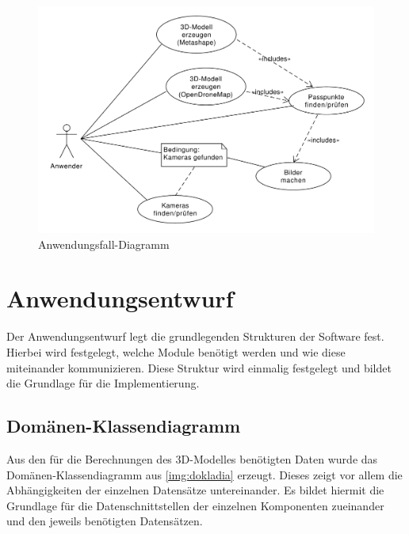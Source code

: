 \documentclass[./00PhotoBox.tex]{subfiles}
\begin{document}
\begin{figure}
    \centering
    \includegraphics[width=1\textwidth]{./img/uml/uml_usecases.pdf}
    \caption{Anwendungsfall-Diagramm} %
    \label{img:anwendungsfall} %
\end{figure}


\section{Anwendungsentwurf}
Der Anwendungsentwurf legt die grundlegenden Strukturen der Software fest. Hierbei wird festgelegt, welche Module benötigt werden und wie diese miteinander kommunizieren. Diese Struktur wird einmalig festgelegt und bildet die Grundlage für die Implementierung.

\subsection{Domänen-Klassendiagramm}
Aus den für die Berechnungen des 3D-Modelles benötigten Daten wurde das Domänen-Klassendiagramm aus \autoref{img:dokladia} erzeugt. Dieses zeigt vor allem die Abhängigkeiten der einzelnen Datensätze untereinander. Es bildet hiermit die Grundlage für die Datenschnittstellen der einzelnen Komponenten zueinander und den jeweils benötigten Datensätzen.
\end{document}
